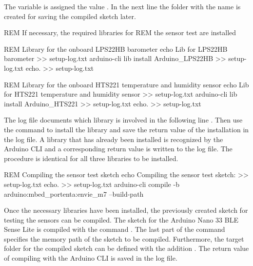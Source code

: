 \medskip


The variable  is assigned the value . In the next line  the folder with the name  is created for saving the compiled sketch later.


\medskip


\begin{PowerShell}
REM If necessary, the required libraries for 
REM the sensor test are installed
	
REM Library for the onboard LPS22HB barometer
echo Lib for LPS22HB barometer >> setup-log.txt
arduino-cli lib install Arduino_LPS22HB >> setup-log.txt
echo. >> setup-log.txt
	
REM Library for the onboard HTS221 temperature and humidity sensor
echo Lib for HTS221 temperature and humidity sensor >> setup-log.txt
arduino-cli lib install Arduino_HTS221 >> setup-log.txt
echo. >> setup-log.txt
\end{PowerShell}

\medskip


The log file documents which library is involved in the following line . Then use the command  to install the library and save the return value of the installation in the log file. A library that has already been installed is recognized by the Arduino CLI and a corresponding return value is written to the log file. The procedure is identical for all three libraries to be installed.

\medskip


\begin{PowerShell}
REM Compiling the sensor test sketch
echo Compiling the sensor test sketch: >> setup-log.txt
echo. >> setup-log.txt
arduino-cli compile -b arduino:mbed_portenta:envie_m7 
--build-path %
\end{PowerShell}

\medskip


Once the necessary libraries have been installed, the previously created sketch for testing the sensors can be compiled. The sketch for the Arduino Nano 33 BLE Sense Lite is compiled with the command . The last part of the command specifies the memory path of the sketch to be compiled. Furthermore, the target folder for the compiled sketch can be defined with the addition . The return value of compiling with the Arduino CLI is saved in the log file.


